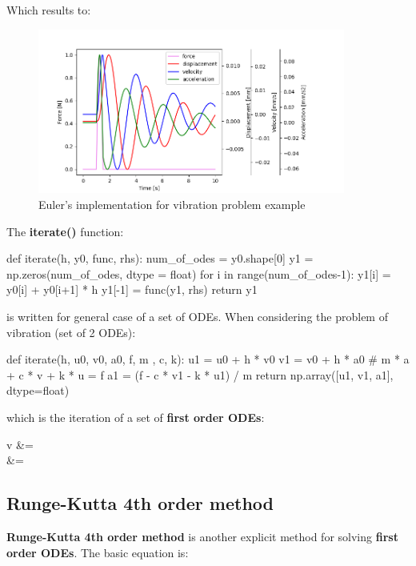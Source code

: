 Which results to:
\begin{figure}[ht]
    \centering
    \includegraphics[width=0.90\textwidth]{img/euler_example.png}
    \caption{Euler's implementation for vibration problem example}
    \label{fig:euler-example-png}
\end{figure}


The \textbf{iterate()} function:
\begin{python}
def iterate(h, y0, func, rhs):
    num_of_odes = y0.shape[0]
    y1 = np.zeros(num_of_odes, dtype = float)
    for i in range(num_of_odes-1):
        y1[i] = y0[i] + y0[i+1] * h
    y1[-1] = func(y1, rhs)
    return y1

\end{python}

is written for general case of a set of ODEs. When considering the problem
of vibration (set of 2 ODEs):
\begin{python}
def iterate(h, u0, v0, a0, f, m , c, k):
    u1 = u0 + h * v0
    v1 = v0 + h * a0
    # m * a + c * v + k * u = f
    a1 = (f - c * v1 - k * u1) / m
    return np.array([u1, v1, a1], dtype=float)
\end{python}

which is the iteration of a set of \textbf{first order ODEs}:
\begin{eqarray}
    v &= \\
     &= 
\end{eqarray}


\newpage
\subsection{Runge-Kutta 4th order method}

\textbf{Runge-Kutta 4th order method} is another explicit method for solving
\textbf{first order ODEs}. The basic equation is:

